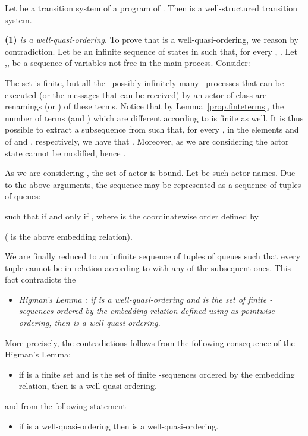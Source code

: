 \documentclass{LMCS}
\theoremstyle{plain}\newtheorem{proposition}[thm]{Proposition}
\theoremstyle{plain}\newtheorem{lemma}[thm]{Lemma}
\theoremstyle{plain}\newtheorem{theorem}[thm]{Theorem}
\theoremstyle{plain}\newtheorem{corollary}[thm]{Corollary}
\newif\ifconf \conffalse
\newcommand{\actroba}{}
\begin{document}
\begin{thm}
\label{thm.decidablestatelessandfinite}
Let  be a transition system of a program
of {\actroba}. 
Then  is a well-structured transition system.
\end{thm}

\ifconf
\else
\proof
{\bf (1)} \emph{ is a well-quasi-ordering}. 
To prove that  is a well-quasi-ordering, we reason by contradiction.
Let  be 
an infinite sequence of states in  such that, for every ,  . 
Let ,, be a sequence of variables not free in the main process.
Consider:

The set  is finite, but all the --possibly infinitely many-- processes
that can be executed
(or the messages that can be received)  
by an actor of class  are renamings  (or ) 
of these terms.
Notice that by Lemma~\ref{prop.finteterms}, the number of terms  
(and ) which are different 
according to  is finite as well. 
It is thus possible to extract 
a subsequence  from 
 such that, for every , in the
elements  and 
of  and , respectively, we have that . Moreover, as we are considering {\actroba} the actor state cannot
be modified, hence .

As we are considering {\actroba}, the set of actor is bound.
Let  be such actor names.
Due to the above arguments, the sequence  may be represented as a sequence of tuples
of queues:

such that  if and only if 
, where  is the 
coordinatewise order defined by

( is the above embedding relation).

We are finally reduced to an infinite sequence of tuples of queues 
such that every tuple cannot be in relation according to 
with any of the subsequent ones.
This fact contradicts the 
\begin{itemize}
\item[] \emph{Higman's Lemma \cite{HigmanLemma}:
if  is a well-quasi-ordering and  is the set of finite 
-sequences ordered by the embedding 
relation  defined using  as pointwise ordering, 
then  is a  well-quasi-ordering.}
\end{itemize}
More precisely, the contradictions follows from the following
consequence of the Higman's Lemma:
\begin{itemize}
\item 
if  is a finite set and  is the set of finite -sequences 
ordered by the embedding 
relation, then  is a  well-quasi-ordering.
\end{itemize}
and from the following statement
\begin{itemize}
\item 
if  is a well-quasi-ordering then  is a well-quasi-ordering.
\end{itemize}
\end{document}
